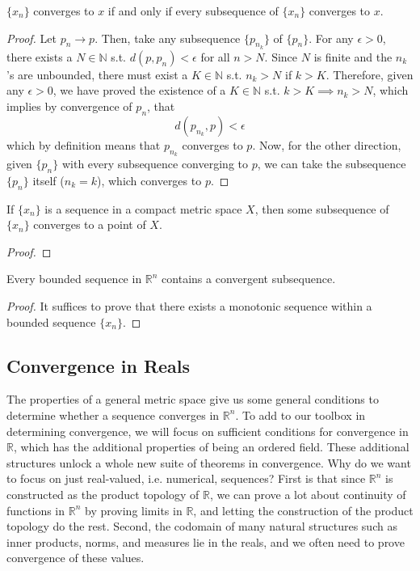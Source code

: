   \begin{lemma}
    $\{x_n\}$ converges to $x$ if and only if every subsequence of $\{x_n\}$ converges to $x$. 
  \end{lemma}
  \begin{proof}
    Let $p_n \rightarrow p$. Then, take any subsequence $\{p_{n_k}\}$ of $\{p_n\}$. For any $\epsilon > 0$, there exists a $N \in \mathbb{N}$ s.t. $d(p, p_n) < \epsilon$ for all $n > N$. Since $N$ is finite and the $n_k$'s are unbounded, there must exist a $K \in \mathbb{N}$ s.t. $n_k > N$ if $k > K$. Therefore, given any $\epsilon > 0$, we have proved the existence of a $K \in \mathbb{N}$ s.t. $k > K \implies n_k > N$, which implies by convergence of $p_n$, that 
    \begin{equation}
      d(p_{n_k}, p) < \epsilon
    \end{equation}
    which by definition means that $p_{n_k}$ converges to $p$. Now, for the other direction, given $\{p_n\}$ with every subsequence converging to $p$, we can take the subsequence $\{p_n\}$ itself ($n_k = k$), which converges to $p$. 
  \end{proof}

  \begin{theorem}
    If $\{x_n\}$ is a sequence in a compact metric space $X$, then some subsequence of $\{x_n\}$ converges to a point of $X$.  
  \end{theorem}
  \begin{proof}
    
  \end{proof}

  \begin{corollary}
    Every bounded sequence in $\mathbb{R}^n$ contains a convergent subsequence. 
  \end{corollary} 
  \begin{proof}
    It suffices to prove that there exists a monotonic sequence within a bounded sequence $\{x_n\}$. 
  \end{proof}

\subsection{Convergence in Reals}

  The properties of a general metric space give us some general conditions to determine whether a sequence converges in $\mathbb{R}^n$. To add to our toolbox in determining convergence, we will focus on sufficient conditions for convergence in $\mathbb{R}$, which has the additional properties of being an ordered field. These additional structures unlock a whole new suite of theorems in convergence. Why do we want to focus on just real-valued, i.e. numerical, sequences? First is that since $\mathbb{R}^n$ is constructed as the product topology of $\mathbb{R}$, we can prove a lot about continuity of functions in $\mathbb{R}^n$ by proving limits in $\mathbb{R}$, and letting the construction of the product topology do the rest. Second, the codomain of many natural structures such as inner products, norms, and measures lie in the reals, and we often need to prove convergence of these values. 

